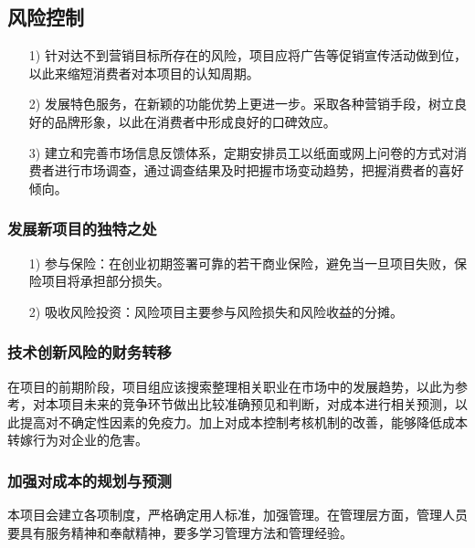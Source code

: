 \documentclass[UTF8]{ctexart}
\begin{document}
\subsection{风险控制}
\begin{itemize}
	\item[1)]针对达不到营销目标所存在的风险，项目应将广告等促销宣传活动做到位，以此来缩短消费者对本项目的认知周期。


	\item[2)]发展特色服务，在新颖的功能优势上更进一步。采取各种营销手段，树立良好的品牌形象，以此在消费者中形成良好的口碑效应。


	\item[3)]建立和完善市场信息反馈体系，定期安排员工以纸面或网上问卷的方式对消费者进行市场调查，通过调查结果及时把握市场变动趋势，把握消费者的喜好倾向。
\end{itemize}
\subsubsection{发展新项目的独特之处}
\begin{itemize}
	\item[1)]参与保险：在创业初期签署可靠的若干商业保险，避免当一旦项目失败，保险项目将承担部分损失。
	\item[2)]吸收风险投资：风险项目主要参与风险损失和风险收益的分摊。
\end{itemize}
\subsubsection{技术创新风险的财务转移}

在项目的前期阶段，项目组应该搜索整理相关职业在市场中的发展趋势，以此为参考，对本项目未来的竞争环节做出比较准确预见和判断，对成本进行相关预测，以此提高对不确定性因素的免疫力。加上对成本控制考核机制的改善，能够降低成本转嫁行为对企业的危害。
\subsubsection{加强对成本的规划与预测}
本项目会建立各项制度，严格确定用人标准，加强管理。在管理层方面，管理人员要具有服务精神和奉献精神，要多学习管理方法和管理经验。
\end{document}
